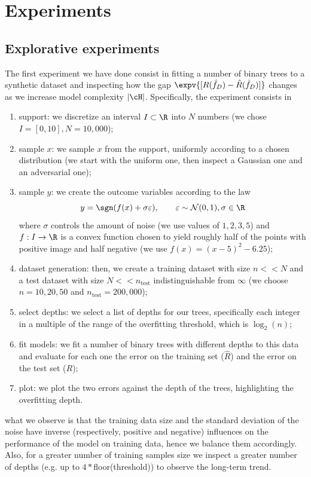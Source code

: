 \section{Experiments}

\subsection{Explorative experiments}
The first experiment we have done consist in fitting a number of binary trees to a synthetic dataset and inspecting how the gap $\expv{[R(\hat f_D) - \hat R(\hat f_D)]}$ changes as we increase model complexity $\vert\cH\vert$. Specifically, the experiment consists in 
\begin{enumerate}
    \item support: we discretize an interval $I\subset \R$ into $N$ numbers (we chose $I=[0,10], N = 10,000$);
    \item sample $x$: we sample $x$ from the support, uniformly according to a chosen distribution (we start with the uniform one, then inspect a Gaussian one and an adversarial one);
    \item sample $y$: we create the outcome variables according to the law \[y = \sgn(f(x)+\sigma\varepsilon), \qquad \varepsilon\sim\mathcal{N}(0,1), \sigma\in\R\]where $\sigma$ controls the amount of noise (we use values of $1,2,3,5$) and $f:I\to\R$ is a convex function chosen to yield roughly half of the points with positive image and half negative (we use $f(x) = (x-5)^2 -6.25$);
    \item dataset generation: then, we create a training dataset with size $n<<N$ and a test dataset with size $N<<n_\text{test}$ indistinguishable from $\infty$ (we choose $n=10,20,50$ and $n_\text{test}=200,000$);
    \item select depths: we select a list of depths for our trees, specifically each integer in a multiple of the range of the overfitting threshold, which is $\log_2(n)$;
    \item fit models: we fit a number of binary trees with different depths to this data and evaluate for each one the error on the training set ($\hat R$) and the error on the test set ($R$);
    \item plot: we plot the two errors against the depth of the trees, highlighting the overfitting depth. 
\end{enumerate}
what we observe is that the training data size and the standard deviation of the noise have inverse (respectively, positive and negative) influences on the performance of the model on training data, hence we balance them accordingly. Also, for a greater number of training samples size we inspect a greater number of depths (e.g. up to $4*$floor(threshold)) to observe the long-term trend. 
\\

